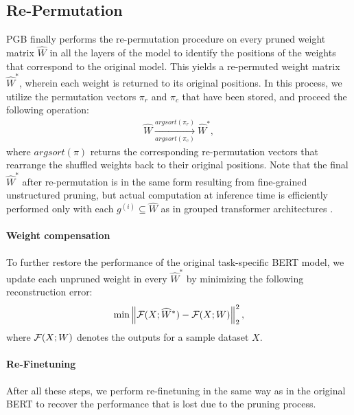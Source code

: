 \subsection{Re-Permutation} \label{sec:repermute}

PGB finally performs the re-permutation procedure on every pruned weight matrix $\widehat{W}$ in all the layers of the model to identify the positions of the weights that correspond to the original model. This yields a re-permuted weight matrix $\widehat{W}^{*}$, wherein each weight is returned to its original positions. In this process,  we utilize the permutation vectors $\pi_{r}$ and $\pi_{c}$ that have been stored, and proceed the following operation: 
\begin{equation*}
\begin{aligned}
\widehat{W} \xrightarrow[argsort(\pi_{c})]{argsort(\pi_{r})} \widehat{W}^{*},
\end{aligned}
\end{equation*}
where $argsort(\pi)$ returns the corresponding re-permutation vectors that rearrange the shuffled weights back to their original positions. Note that the final $\widehat{W}^{*}$ after re-permutation is in the same form resulting from fine-grained unstructured pruning, but actual computation at inference time is efficiently performed only with each $g^{(i)} \subseteq \widehat{W}$ as in grouped transformer architectures \cite{GroupFormer,groupbert}.

\paragraph{Weight compensation}
To further restore the performance of the original task-specific BERT model, we update each unpruned weight in every $\widehat{W}^{*}$ by minimizing the following reconstruction error:
\begin{equation}\label{eq:reconstruction}
     \min \left\|\mathcal{F}(X;\widehat{W}^{*})-\mathcal{F}(X;W)\right\|_{2}^{2},
\end{equation}
where $\mathcal{F}(X; W)$ denotes the outputs for a sample dataset $X$.

\paragraph{Re-Finetuning}
After all these steps, we perform re-finetuning in the same way as in the original BERT \cite{BERT} to recover the performance that is lost due to the pruning process.

